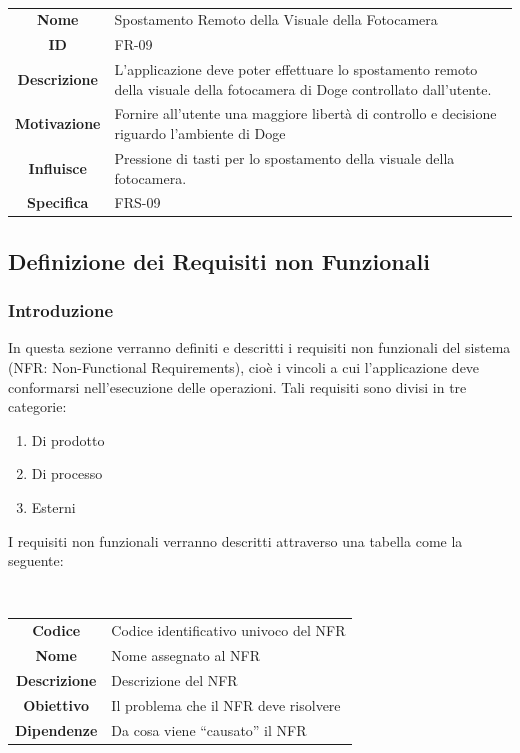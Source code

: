 \documentclass{article}
\begin{document}
~

\begin{adjustbox}{center}
\begin{tabular}{|c|p{10cm}|}
\hline
\textbf{Nome} & Spostamento Remoto della Visuale della Fotocamera \\
\textbf{ID} & FR-09 \\
\textbf{Descrizione} & L'applicazione deve poter effettuare lo spostamento remoto della visuale della fotocamera di Doge controllato dall'utente. \\
\textbf{Motivazione} & Fornire all'utente una maggiore libertà di controllo e decisione riguardo l'ambiente di Doge \\
\textbf{Influisce} & Pressione di tasti per lo spostamento della visuale della fotocamera. \\
\textbf{Specifica} & FRS-09 \\
\hline
\end{tabular}
\end{adjustbox}

\subsection{Definizione dei Requisiti non Funzionali}

\subsubsection{Introduzione}

In questa sezione verranno definiti e descritti i requisiti non funzionali del sistema (NFR: Non-Functional Requirements), cioè i vincoli a cui l’applicazione deve conformarsi nell'esecuzione delle operazioni.
Tali requisiti sono divisi in tre categorie:
\begin{enumerate}
    \item Di prodotto
    \item Di processo
    \item Esterni
\end{enumerate}

I requisiti non funzionali verranno descritti attraverso una tabella come la seguente:

~

\begin{adjustbox}{center}
\begin{tabular}{|c|p{10cm}|}
\hline
\textbf{Codice} & Codice identificativo univoco del NFR\\
\textbf{Nome} & Nome assegnato al NFR\\
\textbf{Descrizione} & Descrizione del NFR\\
\textbf{Obiettivo} & Il problema che il NFR deve risolvere\\
\textbf{Dipendenze} & Da cosa viene ``causato'' il NFR\\
\hline
\end{tabular}
\end{adjustbox}
\end{document}

